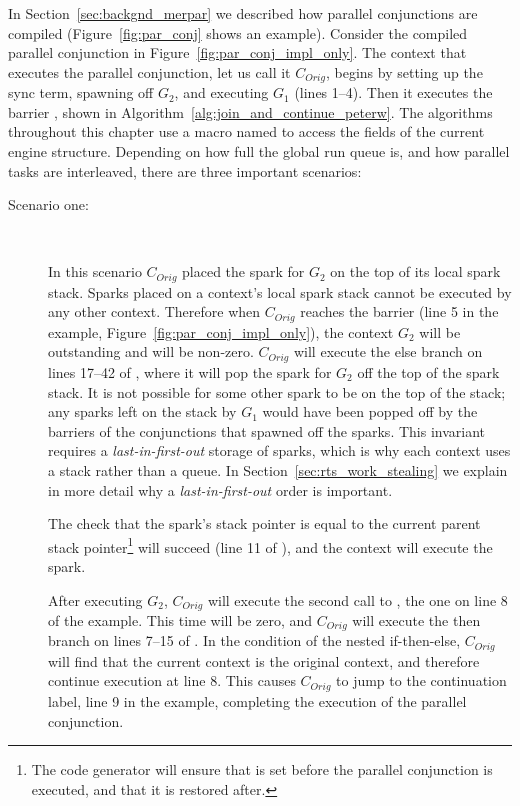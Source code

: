 In Section~\ref{sec:backgnd_merpar} we described how parallel
conjunctions are compiled
(Figure~\ref{fig:par_conj} shows an example).
Consider the compiled parallel conjunction in
Figure~\ref{fig:par_conj_impl_only}.
The context that executes the parallel conjunction,
let us call it $C_{Orig}$,
begins by
setting up the sync term,
spawning off $G_2$,
and executing $G_1$ (lines 1--4).
Then it executes the barrier \joinandcontinue,
shown in
Algorithm~\ref{alg:join_and_continue_peterw}.
The algorithms throughout this chapter use a macro named 
to access the fields of the current engine structure.
Depending on how full the global run queue is,
and how parallel tasks are interleaved,
there are three important scenarios:

\begin{description}

    \item[Scenario one:]~

    In this scenario $C_{Orig}$ placed the spark for $G_2$ on the top of its
    local spark stack.
    Sparks placed on a context's local spark stack cannot be executed by any
    other context.
    Therefore when $C_{Orig}$ reaches the \joinandcontinue barrier
    (line 5 in the example, Figure~\ref{fig:par_conj_impl_only}),
    the context $G_2$ will be outstanding and
     will be non-zero.
    $C_{Orig}$ will execute the else branch on lines 17--42 of
    \joinandcontinue,
    where it will pop the spark for $G_2$ off the top of the spark stack.
    It is not possible for some other spark to be on the top of the stack;
    any sparks left on the stack by $G_1$ would have been popped off by
    the \joinandcontinue barriers of the conjunctions that spawned off the
    sparks.
    This invariant requires a \emph{last-in-first-out} storage of sparks,
    which is why each context uses a stack rather than a queue.
    In Section~\ref{sec:rts_work_stealing} we explain in more detail why
    a \emph{last-in-first-out} order is important.

    The check that the spark's stack pointer is equal to the current
    parent stack pointer\footnote{
        The code generator will ensure that  is set
        before the parallel conjunction is executed,
        and that it is restored after.}
    will succeed (line 11 of \joinandcontinue),
    and the context will execute the spark.

    After executing $G_2$,
    $C_{Orig}$ will execute the second call to \joinandcontinue,
    the one on line 8 of the example.
    This time  will be zero,
    and $C_{Orig}$ will execute the then branch on lines 7--15 of
    \joinandcontinue.
    In the condition of the nested if-then-else,
    $C_{Orig}$ will find that the current context is the original context,
    and therefore continue execution at line 8.
    This causes $C_{Orig}$ to jump to the continuation label,
    line 9 in the example,
    completing the execution of the parallel conjunction.


\end{description}
